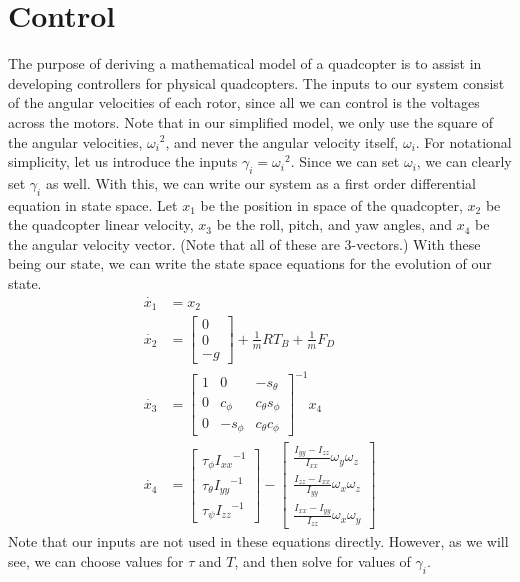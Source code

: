 \documentclass{article}
\newcommand\bmatr[1]{\begin{bmatrix} #1\end{bmatrix}}
\begin{document}
\section*{Control}
The purpose of deriving a mathematical model of a quadcopter is to assist in developing controllers
for physical quadcopters. The inputs to our system consist of the angular velocities of each rotor,
since all we can control is the voltages across the
motors. Note that in our simplified model, we only use the square of the angular velocities,
${\omega_i}^2$, and never the angular velocity itself, $\omega_i$. For notational simplicity, let us
introduce the inputs $\gamma_i = {\omega_i}^2$. Since we can set $\omega_i$, we can
clearly set $\gamma_i$ as well. With this, we can write our system as a first order differential
equation in state space. Let $x_1$ be the position in space of the quadcopter, $x_2$ be the
quadcopter linear velocity, $x_3$ be the roll, pitch, and yaw angles, and $x_4$ be the angular
velocity vector. (Note that all of these are 3-vectors.) With these being our state, we can write
the state space equations for the evolution of our state.
\begin{align*}
    \dot{x_1} &= x_2 \\
    \dot{x_2} &= \bmatr{0 \\ 0 \\ -g} + \frac{1}{m} RT_B + \frac{1}{m} F_D \\
    \dot{x_3} &= \bmatr{
        1 &0 & -s_\theta \\
        0 & c_\phi & c_\theta s_\phi \\
        0 & -s_\phi & c_\theta c_\phi
    }^{-1} x_4 \\
    \dot{x_4} &=  \bmatr{
        \tau_\phi {I_{xx}}^{-1} \\
        \tau_\theta {I_{yy}}^{-1} \\
        \tau_\psi {I_{zz}}^{-1}
    } - \bmatr{
        \frac{I_{yy} - I_{zz}}{I_{xx}} \omega_y\omega_z \\ 
        \frac{I_{zz} - I_{xx}}{I_{yy}} \omega_x\omega_z  \\
        \frac{I_{xx} - I_{yy}}{I_{zz}} \omega_x\omega_y
    }
\end{align*}
Note that our inputs are not used in these equations directly. However, as we will see, we can
choose values for $\tau$ and $T$, and then solve for values of $\gamma_i$.
\end{document}

